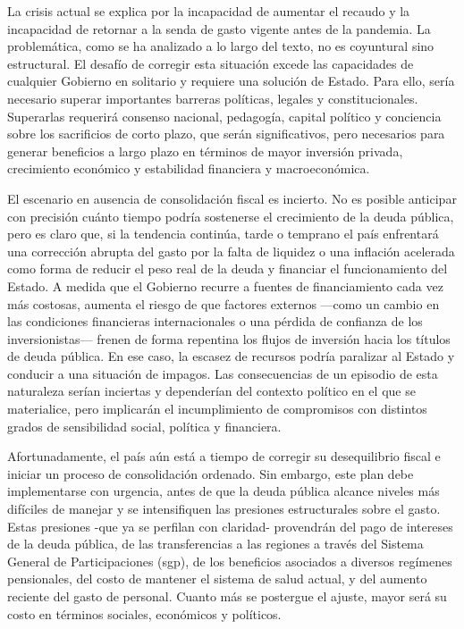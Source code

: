 \begin{epilogo}

La crisis actual se explica por la incapacidad de aumentar el recaudo y la incapacidad de retornar a la senda de gasto vigente antes de la pandemia. La problemática, como se ha analizado a lo largo del texto, no es coyuntural sino estructural. El desafío de corregir esta situación excede las capacidades de cualquier Gobierno en solitario y requiere una solución de Estado. Para ello, sería necesario superar importantes barreras políticas, legales y constitucionales. Superarlas requerirá consenso nacional, pedagogía, capital político y conciencia sobre los sacrificios de corto plazo, que serán significativos, pero necesarios para generar beneficios a largo plazo en términos de mayor inversión privada, crecimiento económico y estabilidad financiera y macroeconómica.

El escenario en ausencia de consolidación fiscal es incierto. No es posible anticipar con precisión cuánto tiempo podría sostenerse el crecimiento de la deuda pública, pero es claro que, si la tendencia continúa, tarde o temprano el país enfrentará una corrección abrupta del gasto por la falta de liquidez o una inflación acelerada como forma de reducir el peso real de la deuda y financiar el funcionamiento del Estado. A medida que el Gobierno recurre a fuentes de financiamiento cada vez más costosas, aumenta el riesgo de que factores externos —como un cambio en las condiciones financieras internacionales o una pérdida de confianza de los inversionistas— frenen de forma repentina los flujos de inversión hacia los títulos de deuda pública. En ese caso, la escasez de recursos podría paralizar al Estado y conducir a una situación de impagos. Las consecuencias de un episodio de esta naturaleza serían inciertas y dependerían del contexto político en el que se materialice, pero implicarán el incumplimiento de compromisos con distintos grados de sensibilidad social, política y financiera. %


Afortunadamente, el país aún está a tiempo de corregir su desequilibrio fiscal e iniciar un proceso de consolidación ordenado. Sin embargo, este plan debe implementarse con urgencia, antes de que la deuda pública alcance niveles más difíciles de manejar y se intensifiquen las presiones estructurales sobre el gasto. Estas presiones -que ya se perfilan con claridad- provendrán del pago de intereses de la deuda pública, de las transferencias a las regiones a través del Sistema General de Participaciones (\gls{sgp}), de los beneficios asociados a diversos regímenes pensionales, del costo de mantener el sistema de salud actual, y del aumento reciente del gasto de personal. Cuanto más se postergue el ajuste, mayor será su costo en términos sociales, económicos y políticos.


\end{epilogo}
